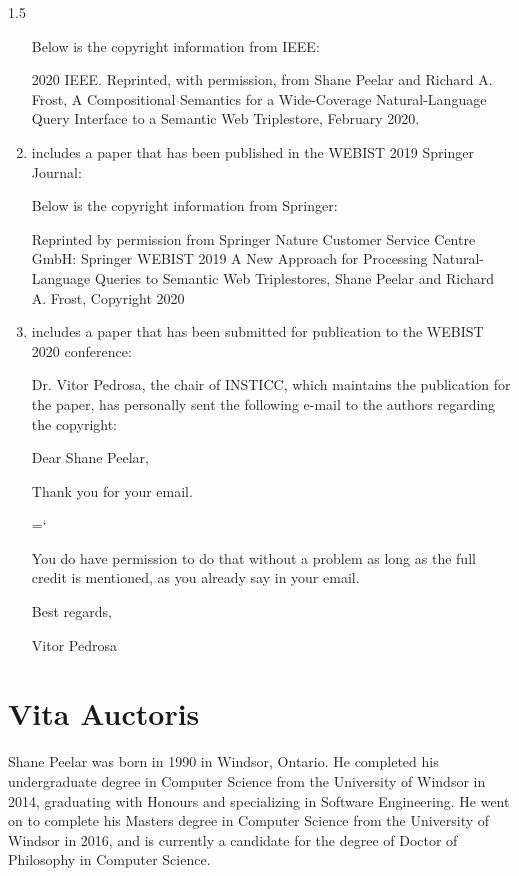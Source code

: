 \documentclass[fleqn, oneside, 12pt]{book}
\theoremstyle{definitionsty}
\newcommand{\uwinonehalfspacelen}{1.5}
\newcommand{\uwindefaultspacelen}{\uwinonehalfspacelen}
\newenvironment{uwindefaultspaceenv}%
{\begin{spacing}{\uwindefaultspacelen}}%
	{\end{spacing}}
\begin{document}
\begin{uwindefaultspaceenv}
\begin{enumerate}
{		

		Below is the copyright information from IEEE:

		2020 IEEE. Reprinted, with permission, from Shane Peelar and Richard A. Frost, A Compositional Semantics for a Wide-Coverage Natural-Language Query Interface to a Semantic Web Triplestore, February 2020.}

	\item { includes a paper that has been published in the WEBIST 2019 Springer Journal:


        Below is the copyright information from Springer:

        Reprinted by permission from Springer Nature Customer Service Centre GmbH: Springer WEBIST 2019 A New Approach for Processing Natural-Language Queries to Semantic Web Triplestores, Shane Peelar and Richard A. Frost, Copyright 2020
    }

	\item { includes a paper that has been submitted for publication to the WEBIST 2020 conference:


   	Dr. Vitor Pedrosa, the chair of INSTICC, which maintains the publication for the paper, has personally sent the following e-mail to the authors regarding the copyright:

    { \ttfamily
    Dear Shane Peelar,

    Thank you for your email.

    \hyphenchar\font=`\-%

    You do have permission to do that without a problem as long as the full credit is mentioned, as you already say in your email.


    Best regards,

    Vitor Pedrosa

    }

    }
\end{enumerate}








\chapter*{Vita Auctoris}

Shane Peelar was born in 1990 in Windsor, Ontario.  He completed his undergraduate degree in Computer Science from the University of Windsor in 2014, graduating with Honours and specializing in Software Engineering.  He went on to complete his Masters degree in Computer Science from the University of Windsor in 2016, and is currently a candidate for the degree of Doctor of Philosophy in Computer Science.

\end{uwindefaultspaceenv}
\end{document}
